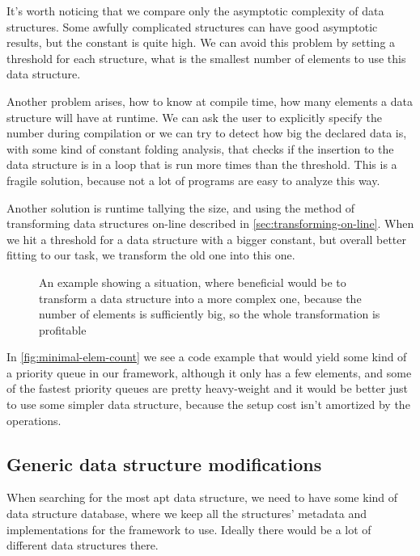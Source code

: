 \documentclass[a4paper,11pt]{article}
\begin{document}
		It's worth noticing that we compare only the asymptotic complexity of data structures. Some awfully
		complicated structures can have good asymptotic results, but the constant is quite high. We can avoid
		this problem by setting a threshold for each structure, what is the smallest number of elements to use
		this data structure.

		Another problem arises, how to know at compile time, how many elements a data structure will have at
		runtime. We can ask the user to explicitly specify the number during compilation or we can try to
		detect how big the declared data is, with some kind of constant folding analysis, that checks if the
		insertion to the data structure is in a loop that is run more times than the threshold. This is a fragile
		solution, because not a lot of programs are easy to analyze this way.

		Another solution is runtime tallying the size, and using the method of transforming data structures
		on-line described in \autoref{sec:transforming-on-line}. When we hit a threshold for a data structure
		with a bigger constant, but overall better fitting to our task, we transform the old one into this one.

		\begin{figure}
			

			\caption{An example showing a situation, where beneficial would be to transform a data structure
				into a more complex one, because the number of elements is sufficiently big, so the
				whole transformation is profitable}

			\label{fig:minimal-elem-count}
		\end{figure}

        In \autoref{fig:minimal-elem-count} we see a code example that would yield some kind of a priority queue in our
        framework, although it only has a few elements, and some of the fastest priority queues are pretty heavy-weight
        and it would be better just to use some simpler data structure, because the setup cost isn't amortized by the
        operations.

	\subsection{Generic data structure modifications} \label{sub:gdsm}

		When searching for the most apt data structure, we need to have some kind of data structure database,
		where we keep all the structures' metadata and implementations for the framework to use. Ideally there
		would be a lot of different data structures there.
\end{document}
